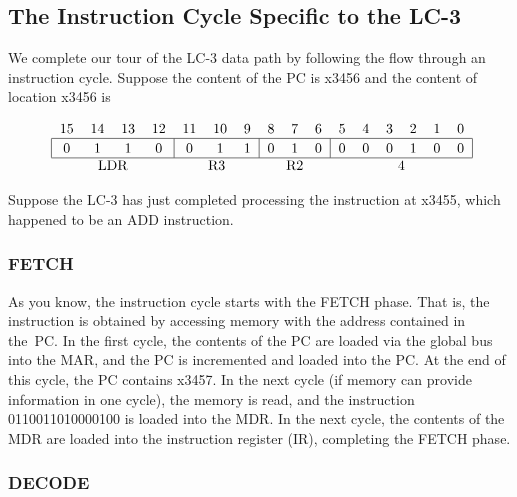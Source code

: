 \documentclass{patt}
\begin{document}
\FloatBarrier
\subsection{The Instruction Cycle Specific to the LC-3}

We complete our tour of the LC-3 data path by following
the flow through an instruction cycle. Suppose the content of the PC
is x3456 and the content of location x3456 is 

\begin{equation*}
\mbox{\renewcommand{\tabcolsep}{6pt}
\begin{tabular}
{cccccccccccccccc}
15 & 14 & 13 & 12 & 11 & 10 & 9 & 8 & 7 & 6 & 5 & 4 & 3 & 2 & 1 & 0 \\
\hline
\multicolumn{1}{|c}{\rule{0pt}{10pt}0\rule{0pt}{10pt}}&
\multicolumn{1}{c}{1}&
\multicolumn{1}{c}{1}&
\multicolumn{1}{c}{0}&
\multicolumn{1}{|c}{0}&
\multicolumn{1}{c}{1}&
\multicolumn{1}{c}{1}&
\multicolumn{1}{|c}{0}&
\multicolumn{1}{c}{1}&
\multicolumn{1}{c}{0}&
\multicolumn{1}{|c}{0}&
\multicolumn{1}{c}{0}&
\multicolumn{1}{c}{0}&
\multicolumn{1}{c}{1}&
\multicolumn{1}{c}{0}&
\multicolumn{1}{c|}{0}\\
\hline
\multicolumn{4}{c}{LDR} &
\multicolumn{3}{c}{R3} &
\multicolumn{3}{c}{R2} &
\multicolumn{6}{c}{4} \\
\end{tabular}}
\end{equation*}


\noindent
Suppose the LC-3 has just completed processing the instruction at
x3455, which happened to be an ADD instruction.

\subsubsection{FETCH}

As you know, the instruction cycle starts with the FETCH phase.  That
is, the instruction is obtained by accessing memory with the address
contained in the~PC. In the first cycle, the contents of the PC are
loaded via the global bus into the MAR, and the PC is incremented and
loaded into the PC.  At the end of this cycle, the PC contains x3457.
In the next cycle (if memory can provide information in one cycle),
the memory is read, and the instruction 0110011010000100 is loaded
into the MDR.  In the next cycle, the contents of the MDR are loaded
into the instruction register (IR), completing the FETCH phase.

\subsubsection{DECODE}
\end{document}
